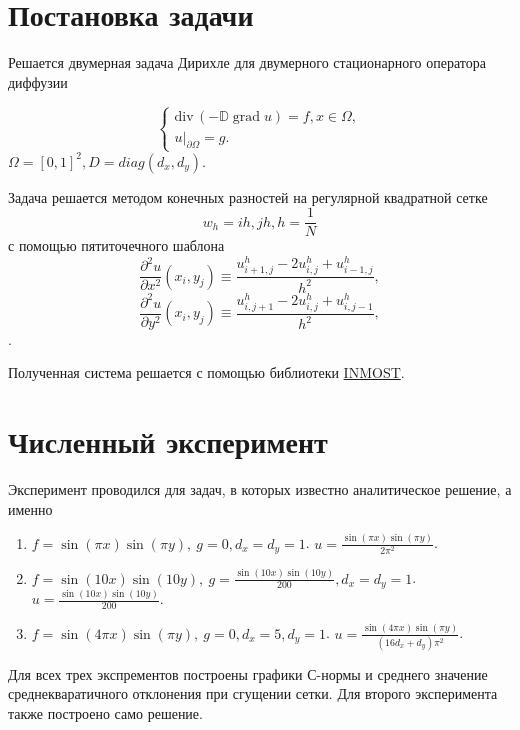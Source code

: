 \documentclass{report}
\DeclareMathOperator{\grad}{grad}
\newcommand{\divg}{\mathrm{div}\,}
\begin{document}
	
\section{Постановка задачи}
Решается двумерная задача Дирихле для двумерного стационарного оператора диффузии

$$
\begin{cases}
    \divg(-\mathbb{D} \grad u) = f, x \in \Omega, \\
    u|_{\partial \Omega} = g.
\end{cases}
$$
$
    \Omega = [0,1]^2, D = diag(d_x, d_y).
$

Задача решается методом конечных разностей на регулярной квадратной сетке
\[
    w_h = {ih, jh}, h = \frac{1}{N}
\]
с помощью пятиточечного шаблона
\[
    \frac{\partial^2 u}{\partial x^2}(x_i, y_j) \equiv \frac{u^h_{i+1,j} - 2u^h_{i,j} + u^h_{i-1,j}}{h^2},
\]
\[
    \frac{\partial^2 u}{\partial y^2}(x_i, y_j) \equiv \frac{u^h_{i,j+1} - 2u^h_{i,j} + u^h_{i,j-1}}{h^2},
\].

Полученная система решается с помощью библиотеки \href{https://github.com/INMOST-DEV/INMOST}{INMOST}.


\section{Численный эксперимент}

Эксперимент проводился для задач, в которых известно аналитическое решение, а именно
\begin{enumerate}
	\item $f = \sin(\pi x) \sin(\pi y),~ g = 0, d_x = d_y = 1$. $u = \frac{\sin(\pi x) \sin(\pi y)}{2 \pi^2}$.
	\item $f = \sin(10 x) \sin(10 y), ~ g = \frac{\sin(10 x) \sin(10 y)}{200} , d_x = d_y = 1$. $u = \frac{\sin(10 x) \sin(10 y)}{200}$.
	\item $f = \sin(4 \pi x) \sin(\pi y), ~ g = 0, d_x = 5, d_y = 1$. $u = \frac{\sin(4 \pi x) \sin(\pi y)}{(16d_x + d_y)\pi^2}$.
\end{enumerate}

Для всех трех экспрементов построены графики С-нормы и среднего значение среднекваратичного отклонения при сгущении сетки.
Для второго эксперимента также построено само решение.
\end{document}
